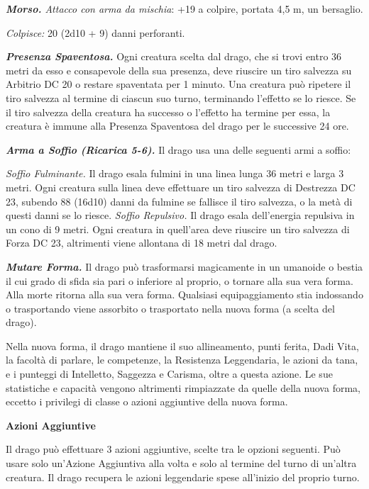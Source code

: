 \begin{multicols}{2}
\emph{\textbf{Morso.} Attacco con arma da mischia}: +19 a colpire,
portata 4,5 m, un bersaglio.

\emph{Colpisce:} 20 (2d10 + 9) danni perforanti.

\emph{\textbf{Presenza Spaventosa.}} Ogni creatura scelta dal drago, che
si trovi entro 36 metri da esso e consapevole della sua presenza, deve
riuscire un tiro salvezza su Arbitrio DC 20 o restare spaventata per 1
minuto. Una creatura può ripetere il tiro salvezza al termine di ciascun
suo turno, terminando l'effetto se lo riesce. Se il tiro salvezza della
creatura ha successo o l'effetto ha termine per essa, la creatura è
immune alla Presenza Spaventosa del drago per le successive 24 ore.

\emph{\textbf{Arma a Soffio (Ricarica 5-6).}} Il drago usa una delle
seguenti armi a soffio:

\emph{Soffio Fulminante.} Il drago esala fulmini in una linea lunga 36
metri e larga 3 metri. Ogni creatura sulla linea deve effettuare un tiro
salvezza di Destrezza DC 23, subendo 88 (16d10) danni da fulmine se
fallisce il tiro salvezza, o la metà di questi danni se lo riesce.
\emph{Soffio Repulsivo.} Il drago esala dell'energia repulsiva in un
cono di 9 metri. Ogni creatura in quell'area deve riuscire un tiro
salvezza di Forza DC 23, altrimenti viene allontana di 18 metri dal
drago.

\emph{\textbf{Mutare Forma.}} Il drago può trasformarsi magicamente in
un umanoide o bestia il cui grado di sfida sia pari o inferiore al
proprio, o tornare alla sua vera forma. Alla morte ritorna alla sua vera
forma. Qualsiasi equipaggiamento stia indossando o trasportando viene
assorbito o trasportato nella nuova forma (a scelta del drago).

Nella nuova forma, il drago mantiene il suo allineamento, punti ferita,
Dadi Vita, la facoltà di parlare, le competenze, la Resistenza
Leggendaria, le azioni da tana, e i punteggi di Intelletto, Saggezza e
Carisma, oltre a questa azione. Le sue statistiche e capacità vengono
altrimenti rimpiazzate da quelle della nuova forma, eccetto i privilegi
di classe o azioni aggiuntive della nuova forma.

\textbf{Azioni Aggiuntive}

Il drago può effettuare 3 azioni aggiuntive, scelte tra le opzioni
seguenti. Può usare solo un'Azione Aggiuntiva alla volta e solo al
termine del turno di un'altra creatura. Il drago recupera le azioni
leggendarie spese all'inizio del proprio turno.


\end{multicols}
